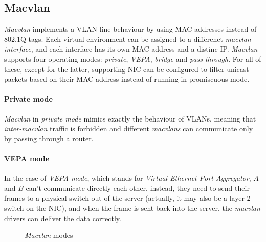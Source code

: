 \subsection{Macvlan}
\emph{Macvlan} implements a VLAN-line behaviour by using MAC addresses instead
of 802.1Q tags. Each virtual environment can be assigned to a differenct
\emph{macvlan interface}, and each interface has its own MAC address and a
distinc IP. \emph{Macvlan} supports four operating modes: \emph{private},
\emph{VEPA}, \emph{bridge} and \emph{pass-through}. For all of these, except
for the latter, supporting NIC can be configured to filter unicast packets
based on their MAC address instead of running in promiscuous mode.

\paragraph{Private mode}
\emph{Macvlan} in \emph{private mode} mimics exactly the behaviour of VLANs,
meaning that \emph{inter-macvlan} traffic is forbidden and different
\emph{macvlans} can communicate only by passing through a router.

\paragraph{VEPA mode}
In the case of \emph{VEPA mode}, which stands for \emph{Virtual Ethernet Port
Aggregator}, $A$ and $B$ can't communicate directly each other, instead, they
need to send their frames to a physical switch out of the server (actually, it
may also be a layer 2 switch on the NIC), and when the frame is sent back into
the server, the \emph{macvlan} drivers can deliver the data correctly.

\begin{figure}[hb!]
    \centering
    \hspace{1.5cm}
    \hspace{1.5cm}
\end{figure}
\newpage
\begin{figure}[h!]
    \ContinuedFloat
    \centering
    \hspace{1.5cm}
    \caption{\emph{Macvlan} modes}
\end{figure}

